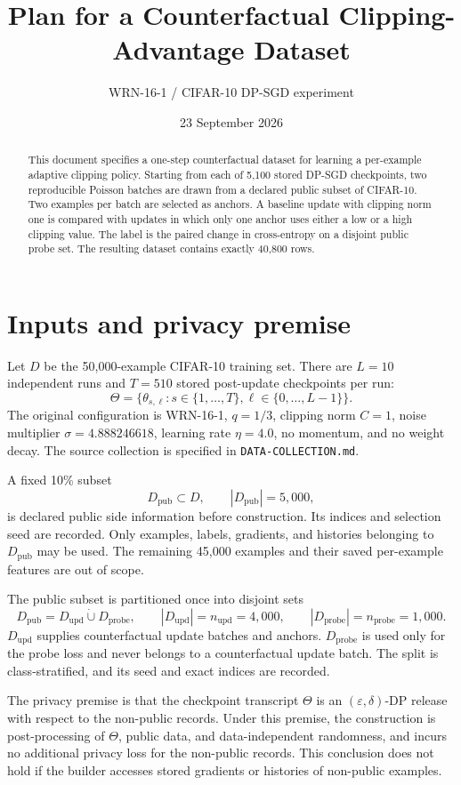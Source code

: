\documentclass[10pt]{article}
\title{Plan for a Counterfactual Clipping-Advantage Dataset}
\author{WRN-16-1 / CIFAR-10 DP-SGD experiment}
\date{23 September 2026}
\newcommand{\Dpub}{D_{\mathrm{pub}}}
\newcommand{\Dupd}{D_{\mathrm{upd}}}
\newcommand{\Dprobe}{D_{\mathrm{probe}}}
\begin{document}
\maketitle

\begin{abstract}
This document specifies a one-step counterfactual dataset for learning a
per-example adaptive clipping policy. Starting from each of 5,100 stored
DP-SGD checkpoints, two reproducible Poisson batches are drawn from a declared
public subset of CIFAR-10. Two examples per batch are selected as anchors. A
baseline update with clipping norm one is compared with updates in which only
one anchor uses either a low or a high clipping value. The label is the paired
change in cross-entropy on a disjoint public probe set. The resulting dataset
contains exactly 40,800 rows.
\end{abstract}

\section{Inputs and privacy premise}

Let $D$ be the 50,000-example CIFAR-10 training set. There are $L=10$
independent runs and $T=510$ stored post-update checkpoints per run:
\[
  \Theta=\{\theta_{s,\ell}:s\in\{1,\ldots,T\},
  \ell\in\{0,\ldots,L-1\}\}.
\]
The original configuration is WRN-16-1, $q=1/3$, clipping norm $C=1$,
noise multiplier $\sigma=4.888246618$, learning rate $\eta=4.0$, no momentum,
and no weight decay. The source collection is specified in
\texttt{DATA-COLLECTION.md}.

A fixed 10\% subset
\[
  \Dpub\subset D,\qquad |\Dpub|=5{,}000,
\]
is declared public side information before construction. Its indices and
selection seed are recorded. Only examples, labels, gradients, and histories
belonging to $\Dpub$ may be used. The remaining 45,000 examples and their
saved per-example features are out of scope.

The public subset is partitioned once into disjoint sets
\[
  \Dpub=\Dupd\mathbin{\dot\cup}\Dprobe,
  \qquad |\Dupd|=n_{\mathrm{upd}}=4{,}000,
  \qquad |\Dprobe|=n_{\mathrm{probe}}=1{,}000.
\]
$\Dupd$ supplies counterfactual update batches and anchors. $\Dprobe$ is used
only for the probe loss and never belongs to a counterfactual update batch.
The split is class-stratified, and its seed and exact indices are recorded.

The privacy premise is that the checkpoint transcript $\Theta$ is an
$(\varepsilon,\delta)$-DP release with respect to the non-public records. Under
this premise, the construction is post-processing of $\Theta$, public data,
and data-independent randomness, and incurs no additional privacy loss for the
non-public records. This conclusion does not hold if the builder accesses
stored gradients or histories of non-public examples.
\end{document}

